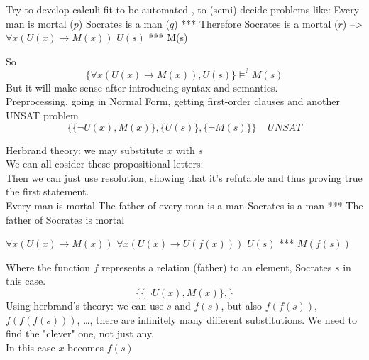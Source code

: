 Try to develop calculi fit to be automated , to (semi) decide problems like:
Every man is mortal ($p$) 
Socrates is a man ($q$)
***
Therefore Socrates is a mortal ($r$)
-->
$\forall x (U(x) \rightarrow M(x))$
$U(s)$
***
M(s)


So 
$$ \{\forall x (U(x) \rightarrow M(x)), U(s)\} \models^? M(s) $$
But it will make sense after introducing syntax and semantics.\\

Preprocessing, going in Normal Form, getting first-order clauses and another UNSAT problem
$$ \{ \{\neg U(x), M(x)\}, \{U(s)\}, \{\neg M(s)\} \} \;\;\;\; UNSAT $$

Herbrand theory: we may substitute $x$ with $s$ 
$$
$$
We can all cosider these propositional letters:
$$ 
$$
Then we can just use resolution, showing that it's refutable and thus proving true the first statement.\\

Every man is mortal 
The father of every man is a man
Socrates is a man
***
The father of Socrates is mortal

$\forall x (U(x) \rightarrow M(x))$
$\forall x (U(x) \rightarrow U(f(x)))$
$U(s)$
***
$M(f(s))$

Where the function $f$ represents a relation (father) to an element, Socrates $s$ in this case.\\


$$ 
\{ \{\neg U(x), M(x)\},
\}
$$
Using herbrand's theory: we can use $s$ and $f(s)$, but also $f(f(s))$, $f(f(f(s)))$, \dots, there are infinitely many different substitutions. We need to find the "clever" one, not just any.\\
In this case $x$ becomes $f(s)$
$$
$$

